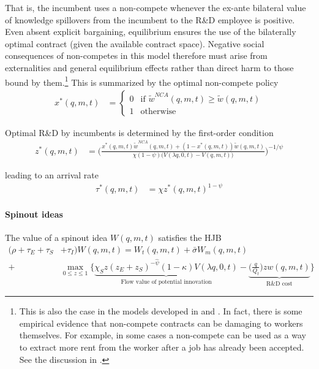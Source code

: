 \documentclass[12pt,english]{article}
\theoremstyle{remark}
\begin{document}
That is, the incumbent uses a non-compete whenever the ex-ante bilateral value of knowledge spillovers from the incumbent to the R\&D employee is positive. Even absent explicit bargaining, equilibrium ensures the use of the bilaterally optimal contract (given the available contract space). Negative social consequences of non-competes in this model therefore must arise from externalities and general equilibrium effects rather than direct harm to those bound by them.\footnote{This is also the case in the models developed in \cite{baslandze_spinout_2019} and \cite{shi_restrictions_2018}. In fact, there is some empirical evidence that non-compete contracts can be damaging to workers themselves. For example, in some cases a non-compete can be used as a way to extract more rent from the worker after a job has already been accepted. See the discussion in \cite{starr_consider_2018}.} This is summarized by the optimal non-compete policy
\begin{align}
	x^*(q,m,t) &= \begin{cases}
	0 & \textrm{if } \tilde{w}^{NCA}(q,m,t) \ge \tilde{w}(q,m,t) \\
	1 & \textrm{otherwise} 
	\end{cases}
\end{align}

Optimal R\&D by incumbents is determined by the first-order condition
\begin{align}
z^*(q,m,t) &= \Bigg( \frac{x^*(q,m,t) \tilde{w}^{NCA}(q,m,t) + (1-x^*(q,m,t))\tilde{w}(q,m,t)}{\chi(1-\psi) \Big(V(\lambda q, 0, t) - V(q,m,t) \Big)}\Bigg)^{-1/\psi}
\end{align}

leading to an arrival rate
\begin{align}
	\tau^*(q,m,t) &= \chi z^*(q,m,t)^{1-\psi} 
\end{align}

\paragraph{Spinout ideas}

The value of a spinout idea $W(q,m,t)$ satisfies the HJB
\begin{align}
(\rho  + \tau_E + \tau_S& + \tau_I)W(q,m,t) = W_t(q,m,t) + \bar{\sigma}W_m(q,m,t) \nonumber \\
+& \max_{0 \le z \le 1} \Big\{ \underbrace{\chi_S z (z_E + z_S)^{-\hat{\psi}} (1-\kappa) V(\lambda q,0,t)}_{\textrm{Flow value of potential innovation}} - \underbrace{\Big(\frac{q}{Q_t}\Big) z w(q,m,t)}_{\textrm{R\&D cost}} \Big\} \label{HJB_S}
\end{align}
\end{document}
